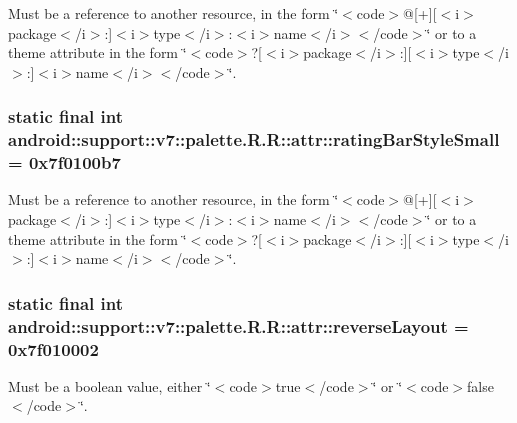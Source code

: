 Must be a reference to another resource, in the form \char`\"{}$<$code$>$@\mbox{[}+\mbox{]}\mbox{[}$<$i$>$package$<$/i$>$:\mbox{]}$<$i$>$type$<$/i$>$:$<$i$>$name$<$/i$>$$<$/code$>$\char`\"{} or to a theme attribute in the form \char`\"{}$<$code$>$?\mbox{[}$<$i$>$package$<$/i$>$:\mbox{]}\mbox{[}$<$i$>$type$<$/i$>$:\mbox{]}$<$i$>$name$<$/i$>$$<$/code$>$\char`\"{}. \hypertarget{classandroid_1_1support_1_1v7_1_1palette_1_1_r_1_1attr_560155167c4b914f52647e0cb2c39c8c}{
\subsubsection[{ratingBarStyleSmall}]{\setlength{\rightskip}{0pt plus 5cm}static final int android::support::v7::palette.R.R::attr::ratingBarStyleSmall = 0x7f0100b7}}
\label{classandroid_1_1support_1_1v7_1_1palette_1_1_r_1_1attr_560155167c4b914f52647e0cb2c39c8c}


Must be a reference to another resource, in the form \char`\"{}$<$code$>$@\mbox{[}+\mbox{]}\mbox{[}$<$i$>$package$<$/i$>$:\mbox{]}$<$i$>$type$<$/i$>$:$<$i$>$name$<$/i$>$$<$/code$>$\char`\"{} or to a theme attribute in the form \char`\"{}$<$code$>$?\mbox{[}$<$i$>$package$<$/i$>$:\mbox{]}\mbox{[}$<$i$>$type$<$/i$>$:\mbox{]}$<$i$>$name$<$/i$>$$<$/code$>$\char`\"{}. \hypertarget{classandroid_1_1support_1_1v7_1_1palette_1_1_r_1_1attr_624e21738eff5350619edce8d52efd84}{
\subsubsection[{reverseLayout}]{\setlength{\rightskip}{0pt plus 5cm}static final int android::support::v7::palette.R.R::attr::reverseLayout = 0x7f010002}}
\label{classandroid_1_1support_1_1v7_1_1palette_1_1_r_1_1attr_624e21738eff5350619edce8d52efd84}


Must be a boolean value, either \char`\"{}$<$code$>$true$<$/code$>$\char`\"{} or \char`\"{}$<$code$>$false$<$/code$>$\char`\"{}. 

